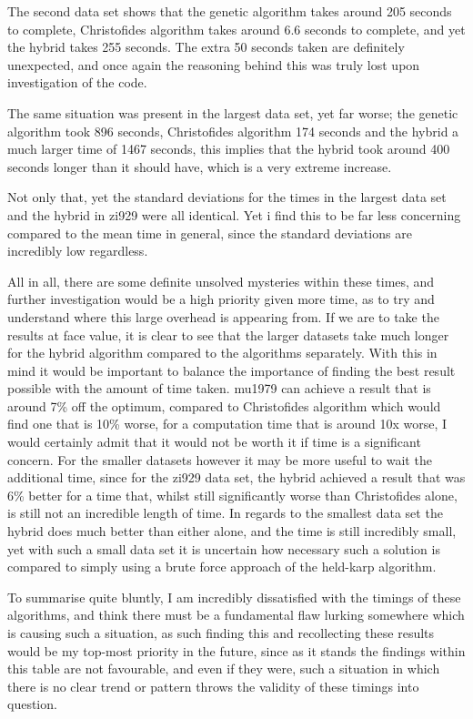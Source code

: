 \documentclass[11pt,a4paper,titlepage]{article}
\begin{document}
The second data set shows that the genetic algorithm takes around 205 seconds to complete, Christofides algorithm takes around 6.6 seconds to complete, and yet the hybrid takes 255 seconds. The extra 50 seconds taken are definitely unexpected, and once again the reasoning behind this was truly lost upon investigation of the code.

The same situation was present in the largest data set, yet far worse; the genetic algorithm took 896 seconds, Christofides algorithm 174 seconds and the hybrid a much larger time of 1467 seconds, this implies that the hybrid took around 400 seconds longer than it should have, which is a very extreme increase. 

Not only that, yet the standard deviations for the times in the largest data set and the hybrid in zi929 were all identical. Yet i find this to be far less concerning compared to the mean time in general, since the standard deviations are incredibly low regardless.

All in all, there are some definite unsolved mysteries within these times, and further investigation would be a high priority given more time, as to try and understand where this large overhead is appearing from. If we are to take the results at face value, it is clear to see that the larger datasets take much longer for the hybrid algorithm compared to the algorithms separately. With this in mind it would be important to balance the importance of finding the best result possible with the amount of time taken. mu1979 can achieve a result that is around 7\% off the optimum, compared to Christofides algorithm which would find one that is 10\% worse, for a computation time that is around 10x worse, I would certainly admit that it would not be worth it if time is a significant concern. For the smaller datasets however it may be more useful to wait the additional time, since for the zi929 data set, the hybrid achieved a result that was 6\% better for a time that, whilst still significantly worse than Christofides alone, is still not an incredible length of time. In regards to the smallest data set the hybrid does much better than either alone, and the time is still incredibly small, yet with such a small data set it is uncertain how necessary such a solution is compared to simply using a brute force approach of the held-karp algorithm.

To summarise quite bluntly, I am incredibly dissatisfied with the timings of these algorithms, and think there must be a fundamental flaw lurking somewhere which is causing such a situation, as such finding this and recollecting these results would be my top-most priority in the future, since as it stands the findings within this table are not favourable, and even if they were, such a situation in which there is no clear trend or pattern throws the validity of these timings into question.
\end{document}
